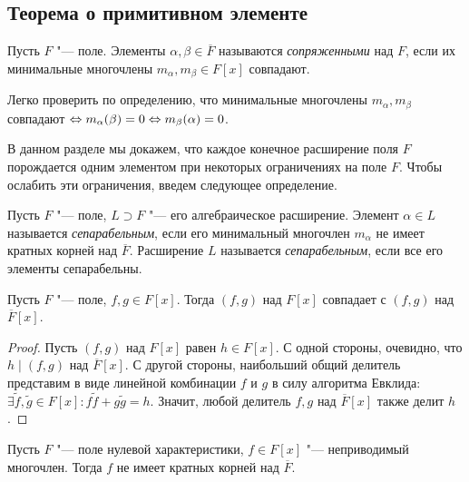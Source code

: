 \subsection{Теорема о примитивном элементе}

\begin{definition}
	Пусть $F$ "--- поле. Элементы $\alpha, \beta \in \overline{F}$ называются \textit{сопряженными} над $F$, если их минимальные многочлены $m_\alpha, m_\beta \in F[x]$ совпадают.
\end{definition}

\begin{note}
	Легко проверить по определению, что минимальные многочлены $m_\alpha, m_\beta$ совпадают $\Leftrightarrow m_\alpha(\beta) = 0 \Leftrightarrow m_\beta(\alpha) = 0$.
\end{note}

В данном разделе мы докажем, что каждое конечное расширение поля $F$ порождается одним элементом при некоторых ограничениях на поле $F$. Чтобы ослабить эти ограничения, введем следующее определение.

\begin{definition}
	Пусть $F$ "--- поле, $L \supset F$ "--- его алгебраическое расширение. Элемент $\alpha \in L$ называется \textit{сепарабельным}, если его минимальный многочлен $m_\alpha$ не имеет кратных корней над $\overline{F}$. Расширение $L$ называется \textit{сепарабельным}, если все его элементы сепарабельны.
\end{definition}

\begin{proposition}
	Пусть $F$ "--- поле, $f, g \in F[x]$. Тогда $(f, g)$ над $F[x]$ совпадает с $(f, g)$ над $\overline{F}[x]$.
\end{proposition}

\begin{proof}
	Пусть $(f, g)$ над $F[x]$ равен $h \in F[x]$. С одной стороны, очевидно, что $h \mid (f, g)$ над $\overline{F}[x]$. С другой стороны, наибольший общий делитель представим в виде линейной комбинации $f$ и $g$ в силу алгоритма Евклида: $\exists \widetilde{f}, \widetilde{g} \in F[x]: f\widetilde{f} + g\widetilde{g} = h$. Значит, любой делитель $f, g$ над $\overline{F}[x]$ также делит $h$.
\end{proof}

\begin{proposition}
	Пусть $F$ "--- поле нулевой характеристики, $f \in F[x]$ "--- неприводимый многочлен. Тогда $f$ не имеет кратных корней над $\overline{F}$.
\end{proposition}

